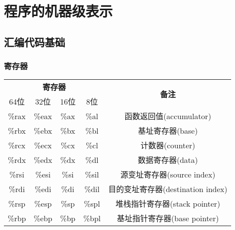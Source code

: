 \section{程序的机器级表示}

\subsection{汇编代码基础}
\subsubsection{寄存器}
\begin{table}[H]
    \centering
    \begin{tabular}{|c|c|c|c|c|}
        \hline
        \multicolumn{4}{|c|}{\textbf{寄存器}} & \multirow{2}{*}{\textbf{备注}}                                                \\
        \cline{1-4}
        64位                                & 32位                          & 16位    & 8位     &                            \\
        \hline
        \%rax                              & \%eax                        & \%ax   & \%al   & 函数返回值(accumulator)         \\
        \hline
        \%rbx                              & \%ebx                        & \%bx   & \%bl   & 基址寄存器(base)                \\
        \hline
        \%rcx                              & \%ecx                        & \%cx   & \%cl   & 计数器(counter)               \\
        \hline
        \%rdx                              & \%edx                        & \%dx   & \%dl   & 数据寄存器(data)                \\
        \hline
        \%rsi                              & \%esi                        & \%si   & \%sil  & 源变址寄存器(source index)       \\
        \hline
        \%rdi                              & \%edi                        & \%di   & \%dil  & 目的变址寄存器(destination index) \\
        \hline
        \%rsp                              & \%esp                        & \%sp   & \%spl  & 堆栈指针寄存器(stack pointer)     \\
        \hline
        \%rbp                              & \%ebp                        & \%bp   & \%bpl  & 基址指针寄存器(base pointer)      \\
        \hline

\end{tabular}
\end{table}
